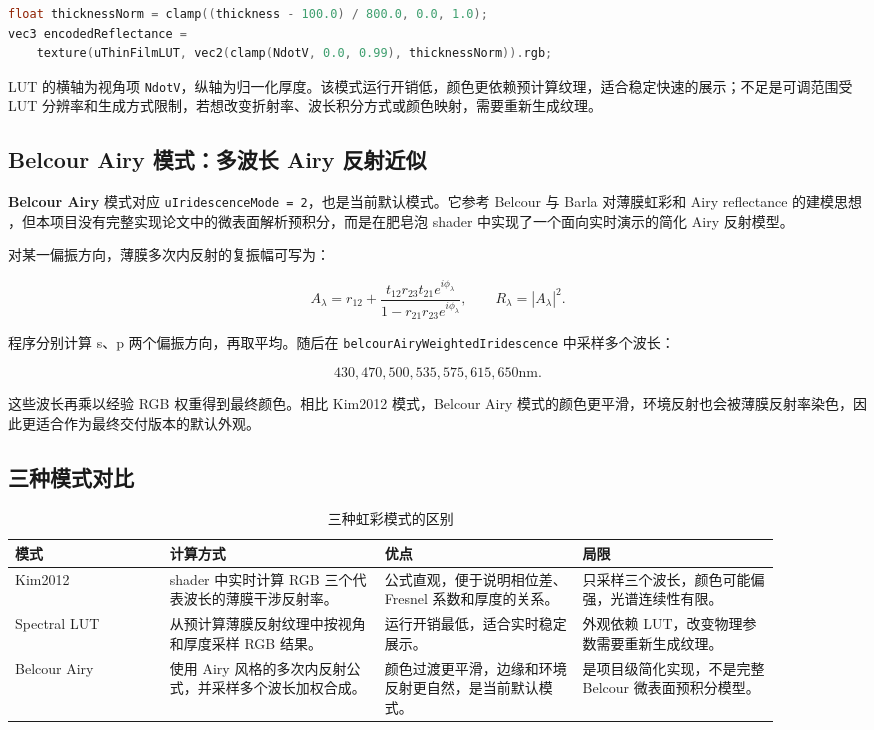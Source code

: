 \documentclass[UTF8,a4paper,11pt]{ctexart}
\newcommand{\codepath}[1]{\texttt{#1}}
\begin{document}
\begin{lstlisting}[language=C++]
float thicknessNorm = clamp((thickness - 100.0) / 800.0, 0.0, 1.0);
vec3 encodedReflectance =
    texture(uThinFilmLUT, vec2(clamp(NdotV, 0.0, 0.99), thicknessNorm)).rgb;
\end{lstlisting}

LUT 的横轴为视角项 \codepath{NdotV}，纵轴为归一化厚度。该模式运行开销低，颜色更依赖预计算纹理，适合稳定快速的展示；不足是可调范围受 LUT 分辨率和生成方式限制，若想改变折射率、波长积分方式或颜色映射，需要重新生成纹理。

\subsection{Belcour Airy 模式：多波长 Airy 反射近似}

\textbf{Belcour Airy} 模式对应 \codepath{uIridescenceMode = 2}，也是当前默认模式。它参考 Belcour 与 Barla 对薄膜虹彩和 Airy reflectance 的建模思想 \cite{belcour2017iridescence}，但本项目没有完整实现论文中的微表面解析预积分，而是在肥皂泡 shader 中实现了一个面向实时演示的简化 Airy 反射模型。

对某一偏振方向，薄膜多次内反射的复振幅可写为：

\[
A_\lambda =
r_{12}
+
\frac{t_{12}r_{23}t_{21}e^{i\phi_\lambda}}
{1-r_{21}r_{23}e^{i\phi_\lambda}},
\qquad
R_\lambda = |A_\lambda|^2.
\]

程序分别计算 s、p 两个偏振方向，再取平均。随后在 \codepath{belcourAiryWeightedIridescence} 中采样多个波长：

\[
430, 470, 500, 535, 575, 615, 650 \mathrm{nm}.
\]

这些波长再乘以经验 RGB 权重得到最终颜色。相比 Kim2012 模式，Belcour Airy 模式的颜色更平滑，环境反射也会被薄膜反射率染色，因此更适合作为最终交付版本的默认外观。

\subsection{三种模式对比}

\begin{table}[H]
  \centering
  \caption{三种虹彩模式的区别}
  \label{tab:modes}
  \begin{tabular}{p{0.18\linewidth}p{0.25\linewidth}p{0.23\linewidth}p{0.23\linewidth}}
    \toprule
    模式 & 计算方式 & 优点 & 局限 \\
    \midrule
    Kim2012 & shader 中实时计算 RGB 三个代表波长的薄膜干涉反射率。 & 公式直观，便于说明相位差、Fresnel 系数和厚度的关系。 & 只采样三个波长，颜色可能偏强，光谱连续性有限。\\
    Spectral LUT & 从预计算薄膜反射纹理中按视角和厚度采样 RGB 结果。 & 运行开销最低，适合实时稳定展示。 & 外观依赖 LUT，改变物理参数需要重新生成纹理。\\
    Belcour Airy & 使用 Airy 风格的多次内反射公式，并采样多个波长加权合成。 & 颜色过渡更平滑，边缘和环境反射更自然，是当前默认模式。 & 是项目级简化实现，不是完整 Belcour 微表面预积分模型。\\
    \bottomrule
  \end{tabular}
\end{table}
\end{document}
